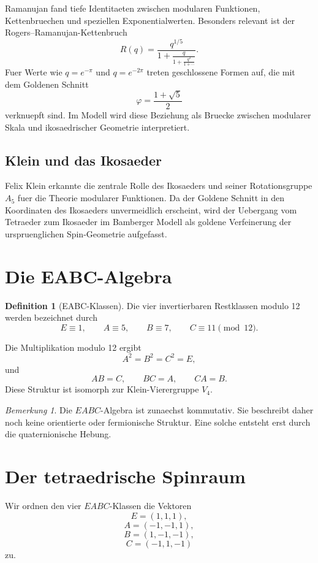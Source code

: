 \documentclass[11pt,a4paper]{article}
\theoremstyle{definition}
\newtheorem{definition}[satz]{Definition}
\theoremstyle{remark}
\newtheorem{bemerkung}[satz]{Bemerkung}
\newcommand{\phig}{\varphi}
\begin{document}
Ramanujan fand tiefe Identitaeten zwischen modularen Funktionen,
Kettenbruechen und speziellen Exponentialwerten. Besonders relevant ist der
Rogers--Ramanujan-Kettenbruch
\[
R(q)=\frac{q^{1/5}}{1+\frac{q}{1+\frac{q^2}{1+\cdots}}}.
\]
Fuer Werte wie \(q=e^{-\pi}\) und \(q=e^{-2\pi}\) treten geschlossene Formen auf,
die mit dem Goldenen Schnitt
\[
\phig=\frac{1+\sqrt5}{2}
\]
verknuepft sind. Im Modell wird diese Beziehung als Bruecke zwischen modularer
Skala und ikosaedrischer Geometrie interpretiert.

\subsection{Klein und das Ikosaeder}

Felix Klein erkannte die zentrale Rolle des Ikosaeders und seiner
Rotationsgruppe \(A_5\) fuer die Theorie modularer Funktionen. Da der Goldene
Schnitt in den Koordinaten des Ikosaeders unvermeidlich erscheint, wird der
Uebergang vom Tetraeder zum Ikosaeder im Bamberger Modell als goldene
Verfeinerung der urspruenglichen Spin-Geometrie aufgefasst.

\section{Die EABC-Algebra}

\begin{definition}[EABC-Klassen]
Die vier invertierbaren Restklassen modulo 12 werden bezeichnet durch
\[
E\equiv 1,\qquad A\equiv 5,\qquad B\equiv 7,\qquad C\equiv 11\pmod{12}.
\]
\end{definition}

Die Multiplikation modulo 12 ergibt
\[
A^2=B^2=C^2=E,
\]
und
\[
AB=C,\qquad BC=A,\qquad CA=B.
\]
Diese Struktur ist isomorph zur Klein-Vierergruppe \(V_4\).

\begin{bemerkung}
Die \(EABC\)-Algebra ist zunaechst kommutativ. Sie beschreibt daher noch keine
orientierte oder fermionische Struktur. Eine solche entsteht erst durch die
quaternionische Hebung.
\end{bemerkung}

\section{Der tetraedrische Spinraum}

Wir ordnen den vier \(EABC\)-Klassen die Vektoren
\[
E=(1,1,1),
\]
\[
A=(-1,-1,1),
\]
\[
B=(1,-1,-1),
\]
\[
C=(-1,1,-1)
\]
zu.
\end{document}
